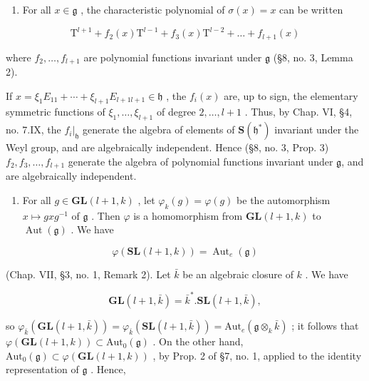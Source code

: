 \begin{enumerate}
\def\labelenumi{(\Roman{enumi})}
\setcounter{enumi}{5}
\tightlist
\item
  For all \(x \in \mathfrak{g}\) , the characteristic polynomial of \(\sigma(x) = x\) can be written
\end{enumerate}

\[
\mathrm{T} ^ {l + 1} + f _ {2} (x) \mathrm{T} ^ {l - 1} + f _ {3} (x) \mathrm{T} ^ {l - 2} + \dots + f _ {l + 1} (x)
\]

where \(f_{2}, \ldots, f_{l+1}\) are polynomial functions invariant under \(\mathfrak{g}\) (§8, no. 3, Lemma 2).

If \(x = \xi_{1}E_{11} + \cdots + \xi_{l+1}E_{l+1 l+1} \in \mathfrak{h}\) , the \(f_{i}(x)\) are, up to sign, the elementary symmetric functions of \(\xi_{1}, \ldots, \xi_{l+1}\) of degree \(2, \ldots, l + 1\) . Thus, by Chap. VI, §4, no. 7.IX, the \(f_{i}|_{\mathfrak{h}}\) generate the algebra of elements of \(\mathbf{S}(\mathfrak{h}^{*})\) invariant under the Weyl group, and are algebraically independent. Hence (§8, no. 3, Prop. 3) \(f_{2}, f_{3}, \ldots, f_{l+1}\) generate the algebra of polynomial functions invariant under \(\mathfrak{g}\), and are algebraically independent.

\begin{enumerate}
\def\labelenumi{(\Roman{enumi})}
\setcounter{enumi}{6}
\tightlist
\item
  For all \(g \in \mathbf{GL}(l + 1, k)\) , let \(\varphi_k(g) = \varphi(g)\) be the automorphism \(x \mapsto gxg^{-1}\) of \(\mathfrak{g}\) . Then \(\varphi\) is a homomorphism from \(\mathbf{GL}(l + 1, k)\) to \(\operatorname{Aut}(\mathfrak{g})\) . We have
\end{enumerate}

\[
\varphi (\mathbf {S L} (l + 1, k)) = \operatorname{Aut} _ {e} (\mathfrak {g})
\]

(Chap. VII, §3, no. 1, Remark 2). Let \(\bar{k}\) be an algebraic closure of \(k\) . We have

\[
\mathbf {G L} (l + 1, \bar {k}) = \bar {k} ^ {*}. \mathbf {S L} (l + 1, \bar {k}),
\]

so \(\varphi_{\bar{k}}(\mathbf{GL}(l + 1,\bar{k})) = \varphi_{\bar{k}}(\mathbf{SL}(l + 1,\bar{k})) = \mathrm{Aut}_e(\mathfrak{g}\otimes_k\bar{k})\) ; it follows that \(\varphi (\mathbf{GL}(l + 1,k))\subset \mathrm{Aut}_0(\mathfrak{g})\) . On the other hand, \(\mathrm{Aut}_0(\mathfrak{g})\subset \varphi (\mathbf{GL}(l + 1,k))\) , by Prop. 2 of §7, no. 1, applied to the identity representation of \(\mathfrak{g}\) . Hence,


